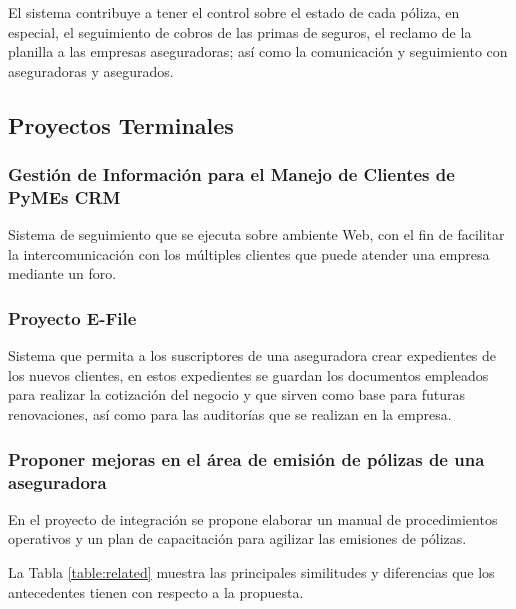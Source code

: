 El sistema contribuye a tener el control sobre el estado de cada póliza, en especial, el seguimiento de cobros de las primas de seguros, el reclamo de la planilla a las empresas aseguradoras; as\'i como la comunicación y seguimiento con aseguradoras y asegurados.

\subsection*{Proyectos Terminales}

\subsubsection*{Gestión de Información para el Manejo de Clientes de PyMEs CRM \cite{pro:crm}}

Sistema  de  seguimiento  que  se  
ejecuta sobre ambiente Web, con el fin de facilitar la intercomunicación con los múltiples clientes 
que puede atender una empresa mediante un foro.

\subsubsection*{Proyecto E-File \cite{pro:zurich}}

Sistema  que  permita  a  los  suscriptores  de  una 
aseguradora  crear expedientes de los nuevos clientes, en 
estos   expedientes   se   guardan   los   documentos   empleados   para   realizar  la  cotización  del  negocio  y  que  sirven  como  base  para  
futuras renovaciones, así como para las auditorías que se realizan en la empresa. 

\subsubsection*{Proponer mejoras en el área de emisión de pólizas de una aseguradora \cite{pro:emi}}

En  el  proyecto  de  integración  se  propone  elaborar un manual de procedimientos operativos y un plan de capacitación para agilizar las emisiones de pólizas.

La Tabla \ref{table:related} muestra las principales similitudes y diferencias que los antecedentes tienen con respecto a la propuesta.


